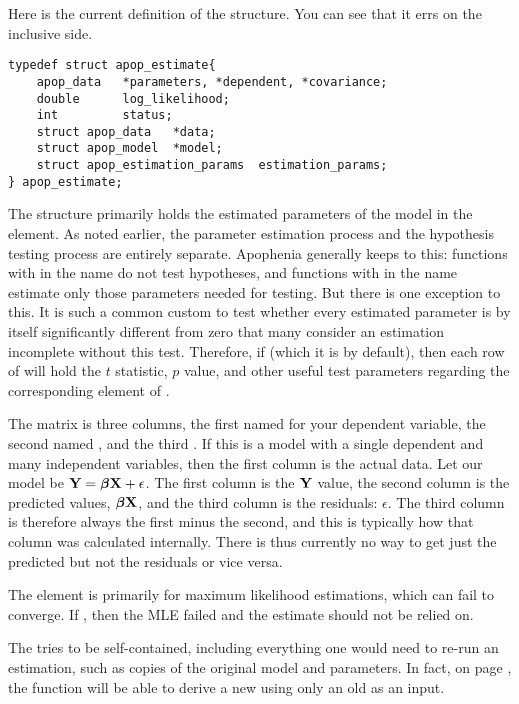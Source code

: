 Here is the current definition of the  structure. You can see that it errs on the inclusive side.
\begin{lstlisting}
typedef struct apop_estimate{
    apop_data   *parameters, *dependent, *covariance;
    double      log_likelihood;
    int         status;
    struct apop_data   *data;
    struct apop_model  *model;
    struct apop_estimation_params  estimation_params;
} apop_estimate;
\end{lstlisting}

The  structure primarily holds the estimated
parameters of the model in the 
element. As noted earlier, the parameter estimation process and the
hypothesis testing process are entirely separate. Apophenia generally
keeps to this: functions with  in the name do not
test hypotheses, and functions with  in the name estimate
only those parameters needed for testing. But there is one exception
to this. It is such a common custom to test whether every estimated
parameter is by itself significantly different from zero that many
consider an estimation incomplete without this test. Therefore, if
 (which it is by default), then 
each row of  will hold the $t$ statistic,
$p$ value, and other useful test parameters regarding the corresponding
element of .

The  matrix is three columns, the first named for
your dependent variable, the second named
, and the third . 
If this is a model with a single dependent and many
independent variables, then the first column is the actual data. Let our
model be ${\bf Y} = {\mbox{\boldmath$\beta$}} {\bf X} + \epsilon$. The first column is the ${\bf Y}$
value, the second column is the
predicted values, ${\mbox{\boldmath$\beta$}} {\bf X}$, and the third column is the residuals:
$\epsilon$. The third column is therefore always the first minus
the second, and this is typically how that column was calculated
internally. There is thus currently no way to get just the predicted
but not the residuals or vice versa.

The  element is primarily for maximum likelihood
estimations, which can fail to converge. If ,
then the MLE failed and the estimate should not be relied on.

The  tries to be self-contained, including
everything one would need to re-run an estimation, such as copies of the
original model and parameters. In fact, on page
\pageref{restart}, the  function will be
able to derive a new  using only an old
 as an input. 

